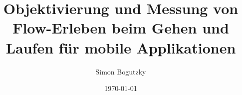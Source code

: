 

\title{Objektivierung und Messung von Flow-Erleben beim Gehen und Laufen für mobile Applikationen} 
\author{Simon Bogutzky} 
\date{\today}


